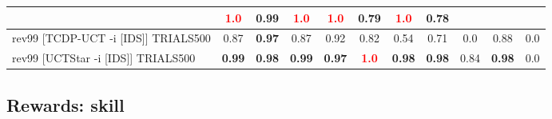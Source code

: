 \documentclass{article}
\begin{document}
\begin{tabular}{|l|r@{$\pm$}rr@{$\pm$}rr@{$\pm$}rr@{$\pm$}rr@{$\pm$}rr@{$\pm$}rr@{$\pm$}rr@{$\pm$}rr@{$\pm$}rr@{$\pm$}r|}
& \multicolumn{2}{c}{\textbf{\textcolor{red}{1.0}}}
& \multicolumn{2}{c}{0.99}
& \multicolumn{2}{c}{\textbf{\textcolor{red}{1.0}}}
& \multicolumn{2}{c}{\textbf{\textcolor{red}{1.0}}}
& \multicolumn{2}{c}{0.79}
& \multicolumn{2}{c}{\textbf{\textcolor{red}{1.0}}}
& \multicolumn{2}{c|}{0.78}
\\
\hline
rev99 [TCDP-UCT -i [IDS]] TRIALS500
& \multicolumn{2}{c}{0.87}
& \multicolumn{2}{c}{\textbf{0.97}}
& \multicolumn{2}{c}{0.87}
& \multicolumn{2}{c}{0.92}
& \multicolumn{2}{c}{0.82}
& \multicolumn{2}{c}{0.54}
& \multicolumn{2}{c}{0.71}
& \multicolumn{2}{c}{0.0}
& \multicolumn{2}{c}{0.88}
& \multicolumn{2}{c|}{0.0}
\\
rev99 [UCTStar -i [IDS]] TRIALS500
& \multicolumn{2}{c}{\textbf{0.99}}
& \multicolumn{2}{c}{\textbf{0.98}}
& \multicolumn{2}{c}{\textbf{0.99}}
& \multicolumn{2}{c}{\textbf{0.97}}
& \multicolumn{2}{c}{\textbf{\textcolor{red}{1.0}}}
& \multicolumn{2}{c}{\textbf{0.98}}
& \multicolumn{2}{c}{\textbf{0.98}}
& \multicolumn{2}{c}{0.84}
& \multicolumn{2}{c}{\textbf{0.98}}
& \multicolumn{2}{c|}{0.0}
\\
\hline
\end{tabular}%

\bigskip

\subsection*{Rewards: skill}
\end{document}
